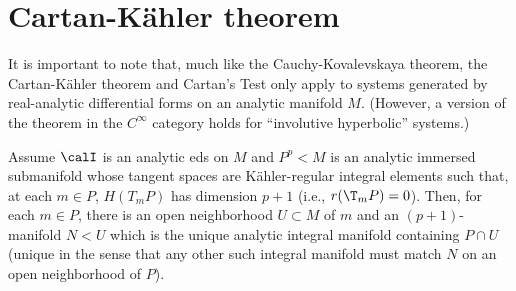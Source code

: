 \section{Cartan-K\"ahler theorem}


It is important to note that, much like the Cauchy-Kovalevskaya theorem, the Cartan-K\"ahler theorem and Cartan's Test only apply to systems generated by real-analytic differential forms on an analytic manifold $M$. (However, a version of the theorem in the $C^\infty$ category holds for ``involutive hyperbolic'' systems.)

\begin{thm}\label{thm 8.3.1 Ivey}
    Assume $\calI$ is an analytic \gls{eds} on $M$ and $P^p<M$ is an analytic immersed submanifold whose tangent spaces are K\"ahler-regular integral elements such that, at each $m\in P$, $H(T_m P)$ has dimension $p+1$ (i.e., $r(\T_m P)=0$). Then, for each $m\in P$, there is an open neighborhood $U\subset M$ of $m$ and an $(p+1)$-manifold $N<U$ which is the unique analytic integral manifold containing $P\cap U$ (unique in the sense that any other such integral manifold must match $N$ on an open neighborhood of $P$).
\end{thm}
